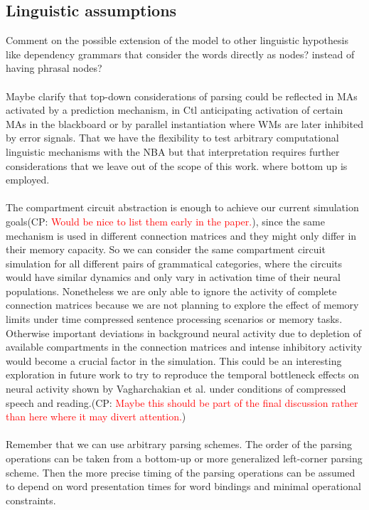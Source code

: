 \documentclass[10pt]{article}
\newcommand{\noteCP}[1]{(CP: \textcolor{red}{#1})}
\begin{document}
\subsection{Linguistic assumptions}


Comment on the possible extension of the model to other linguistic hypothesis like dependency grammars that consider the words directly as nodes? instead of having phrasal nodes?\\~\\


Maybe clarify that top-down considerations of parsing could be reflected in MAs activated by a prediction mechanism, in Ctl anticipating activation of certain MAs in the blackboard or by parallel instantiation where WMs are later inhibited by error signals.
That we have the flexibility to test arbitrary computational linguistic mechanisms with the NBA but that interpretation requires further considerations that we leave out of the scope of this work.
where bottom up is employed.\\~\\


The compartment circuit abstraction is enough to achieve our current simulation goals\noteCP{Would be nice to list them early in the paper.}, since the same mechanism is used in different connection matrices and they might only differ in their memory capacity.
So we can consider the same compartment circuit simulation for all different pairs of grammatical categories, where the circuits would have similar dynamics and only vary in activation time of their neural populations.
Nonetheless we are only able to ignore the activity of complete connection matrices because we are not planning to explore the effect of memory limits under time compressed sentence processing scenarios or memory tasks.
Otherwise important deviations in background neural activity due to depletion of available compartments in the connection matrices and intense inhibitory activity would become a crucial factor in the simulation.
This could be an interesting exploration in future work to try to reproduce the temporal bottleneck effects on neural activity shown by Vagharchakian et al. under conditions of compressed speech and reading\cite{Vagharchakian_2012}.\noteCP{Maybe this should be part of the final discussion rather than here where it may divert attention.}\\~\\


Remember that we can use arbitrary parsing schemes.
The order of the parsing operations can be taken from a bottom-up or more generalized left-corner parsing scheme.
Then the more precise timing of the parsing operations can be assumed to depend on word presentation times for word bindings and minimal operational constraints.
\end{document}
